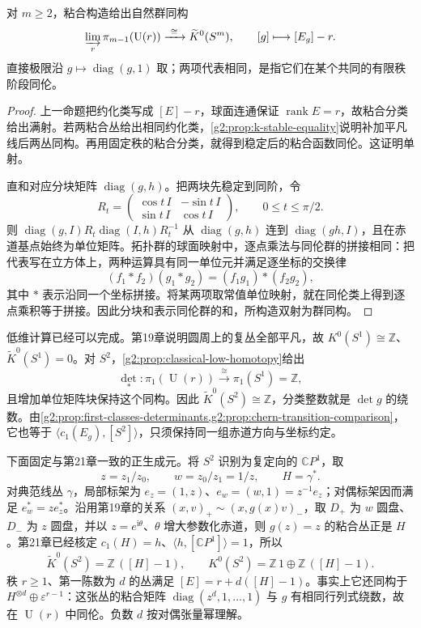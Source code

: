 \begin{proposition}\label{g2:prop:k-clutching-spheres}
	对 \(m\ge2\)，粘合构造给出自然群同构
	\[
		\varinjlim_r\pi_{m-1}(\operatorname{U}(r))
		\xrightarrow{\ \cong\ }\widetilde K^0(S^m),
		\qquad[g]\longmapsto[E_g]-r.
	\]
	直接极限沿 \(g\mapsto\operatorname{diag}(g,1)\) 取；两项代表相同，是指它们在某个共同的有限秩阶段同伦。
\end{proposition}
\begin{proof}
	上一命题把约化类写成 \([E]-r\)，球面连通保证 \(\operatorname{rank}E=r\)，故粘合分类给出满射。若两粘合丛给出相同约化类，\cref{g2:prop:k-stable-equality}说明补加平凡线后两丛同构。再用固定秩的粘合分类，就得到稳定后的粘合函数同伦。这证明单射。

	直和对应分块矩阵 \(\operatorname{diag}(g,h)\)。把两块先稳定到同阶，令
	\[
		R_t=\begin{pmatrix}\cos t\,I&-\sin t\,I\\\sin t\,I&\cos t\,I\end{pmatrix},\qquad
		0\le t\le\pi/2.
	\]
	则 \(\operatorname{diag}(g,I)R_t\operatorname{diag}(I,h)R_t^{-1}\) 从 \(\operatorname{diag}(g,h)\) 连到 \(\operatorname{diag}(gh,I)\)，且在赤道基点始终为单位矩阵。拓扑群的球面映射中，逐点乘法与同伦群的拼接相同：把代表写在立方体上，两种运算具有同一单位元并满足逐坐标的交换律
	\[
		(f_1*f_2)(g_1*g_2)=(f_1g_1)*(f_2g_2),
	\]
	其中 \(*\) 表示沿同一个坐标拼接。将某两项取常值单位映射，就在同伦类上得到逐点乘积等于拼接。因此分块和表示同伦群的和，所构造双射为群同构。
\end{proof}

低维计算已经可以完成。第19章说明圆周上的复丛全部平凡，故 \(K^0(S^1)\cong\mathbb Z\)、\(\widetilde K^0(S^1)=0\)。对 \(S^2\)，\cref{g2:prop:classical-low-homotopy}给出
\[
	\det_*:\pi_1(\operatorname{U}(r))\xrightarrow{\ \cong\ }\pi_1(S^1)=\mathbb Z,
\]
且增加单位矩阵块保持这个同构。因此 \(\widetilde K^0(S^2)\cong\mathbb Z\)，分类整数就是 \(\det g\) 的绕数。由\cref{g2:prop:first-classes-determinants,g2:prop:chern-transition-comparison}，它也等于 \(\langle c_1(E_g),[S^2]\rangle\)，只须保持同一组赤道方向与坐标约定。

下面固定与第21章一致的正生成元。将 \(S^2\) 识别为复定向的 \(\mathbb CP^1\)，取
\[
	z=z_1/z_0,\qquad w=z_0/z_1=1/z,\qquad H=\gamma^*.
\]
对典范线丛 \(\gamma\)，局部标架为 \(e_z=(1,z)\)、\(e_w=(w,1)=z^{-1}e_z\)；对偶标架因而满足 \(e_w^*=z e_z^*\)。沿用第19章的关系 \((x,v)_+\sim(x,g(x)v)_-\)，取 \(D_+\) 为 \(w\) 圆盘、\(D_-\) 为 \(z\) 圆盘，并以 \(z=e^{\mathrm i\theta}\)、\(\theta\) 增大参数化赤道，则 \(g(z)=z\) 的粘合丛正是 \(H\)。第21章已经核定 \(c_1(H)=h\)、\(\langle h,[\mathbb CP^1]\rangle=1\)，所以
\begin{equation}\label{g2:eq:k-two-sphere-additive}
	\widetilde K^0(S^2)=\mathbb Z\,([H]-1),\qquad
	K^0(S^2)=\mathbb Z\,1\oplus\mathbb Z\,([H]-1).
\end{equation}
秩 \(r\ge1\)、第一陈数为 \(d\) 的丛满足 \([E]=r+d([H]-1)\)。事实上它还同构于 \(H^{\otimes d}\oplus\varepsilon^{r-1}\)：这张丛的粘合矩阵 \(\operatorname{diag}(z^d,1,\ldots,1)\) 与 \(g\) 有相同行列式绕数，故在 \(\operatorname{U}(r)\) 中同伦。负数 \(d\) 按对偶张量幂理解。

